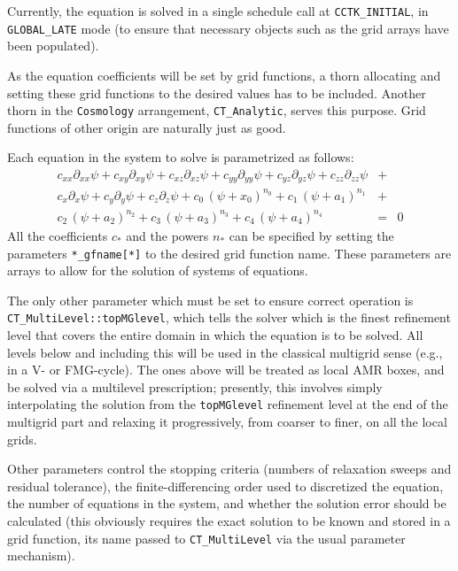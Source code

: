 Currently, the equation is solved in a single schedule call at 
\texttt{CCTK\_INITIAL}, in \texttt{GLOBAL\_LATE} mode (to ensure
that necessary objects such as the grid arrays have been populated).

As the equation coefficients will be set by grid functions, a thorn
allocating and setting these grid functions to the desired values
has to be included. Another thorn in the \texttt{Cosmology} arrangement,
\texttt{CT\_Analytic}, serves this purpose. Grid functions of other
origin are naturally just as good.

Each equation in the system to solve is parametrized as
follows:
\begin{eqnarray}
c_{xx} \partial_{xx} \psi + c_{xy} \partial_{xy} \psi + c_{xz} \partial_{xz} \psi + 
c_{yy} \partial_{yy} \psi + c_{yz} \partial_{yz} \psi + c_{zz} \partial_{zz} \psi &+& \nonumber\\
c_{x} \partial_{x} \psi + c_{y} \partial_{y} \psi + c_{z} \partial_{z} \psi +
c_{0} \, (\psi+x_0)^{n_0} + c_{1} \, (\psi+a_1)^{n_1} &+& \nonumber \\
c_{2} \, (\psi+a_2)^{n_2} + c_{3} \, (\psi+a_3)^{n_3} + c_{4} \, (\psi+a_4)^{n_4} &=& 0
\end{eqnarray}
All the coefficients $c_*$ and the powers $n_*$ can be specified by
setting the parameters \texttt{*\_gfname[*]} to the desired grid 
function name. These parameters are arrays to allow for the solution 
of systems of equations.

The only other parameter which must be set to ensure correct 
operation is \texttt{CT\_MultiLevel::topMGlevel}, which tells the
solver which is the finest refinement level that covers the entire
domain in which the equation is to be solved. All levels below and
including this will be used in the classical multigrid sense
(e.g., in a V- or FMG-cycle). The ones above will be treated as
local AMR boxes, and be solved via a multilevel prescription; 
presently, this involves simply interpolating the solution from
the \texttt{topMGlevel} refinement level at the end of the 
multigrid part and relaxing it progressively, from coarser to 
finer, on all the local grids. 

Other parameters control the stopping criteria (numbers of 
relaxation sweeps and residual tolerance), the finite-differencing 
order used to discretized the equation, the number of equations
in the system, and whether the solution error should be calculated
(this obviously requires the exact solution to be known and
stored in a grid function, its name passed to \texttt{CT\_MultiLevel}
via the usual parameter mechanism).

